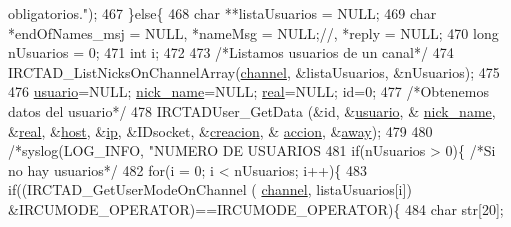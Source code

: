 \begin{DoxyCode}
{{{{{{{       obligatorios."});
467                         \}\textcolor{keywordflow}{else}\{
468                                 \textcolor{keywordtype}{char} **listaUsuarios = NULL;
469                                 \textcolor{keywordtype}{char} *endOfNames\_msj = NULL, *nameMsg = NULL;\textcolor{comment}{//, *reply = NULL;}
470                                 \textcolor{keywordtype}{long} nUsuarios = 0;
471                                 \textcolor{keywordtype}{int} i;
472 
473                                 \textcolor{comment}{/*Listamos usuarios de un canal*/}
474                                 IRCTAD\_ListNicksOnChannelArray(\hyperlink{_g-2361-06-_p1-_server_8c_a842ca2f026578e5c479c095ff3335969}{channel}, &listaUsuarios, &nUsuarios);
475 
476                                 \hyperlink{_g-2361-06-_p1-_server_8c_a0147a5b81499984f9cb00379a8cb84af}{usuario}=NULL; \hyperlink{_g-2361-06-_p1-_server_8c_aabbf66718cda228b924a4a9441eadf62}{nick\_name}=NULL; 
      \hyperlink{_g-2361-06-_p1-_server_8c_af832f551e1c343666c3d2a55834139a0}{real}=NULL; \textcolor{keywordtype}{id}=0;
477                                 \textcolor{comment}{/*Obtenemos datos del usuario*/}
478                                 IRCTADUser\_GetData (&\textcolor{keywordtype}{id}, &\hyperlink{_g-2361-06-_p1-_server_8c_a0147a5b81499984f9cb00379a8cb84af}{usuario}, &
      \hyperlink{_g-2361-06-_p1-_server_8c_aabbf66718cda228b924a4a9441eadf62}{nick\_name}, &\hyperlink{_g-2361-06-_p1-_server_8c_af832f551e1c343666c3d2a55834139a0}{real}, &\hyperlink{_g-2361-06-_p1-_server_8c_a1c2046dcb30a629d6d9f45ff8f403f12}{host}, &\hyperlink{_g-2361-06-_p1-_server_8c_afbc356cd0e25d1dbbece7c10fd025fa6}{ip}, &IDsocket, &\hyperlink{_g-2361-06-_p1-_server_8c_a26292066ca0d17922eadee4161542ab9}{creacion}, &
      \hyperlink{_g-2361-06-_p1-_server_8c_a93e785c991445d8b8ee99c2e51242d5a}{accion}, &\hyperlink{_g-2361-06-_p1-_server_8c_adf86742e21384f58f8999d8317e6a370}{away});
479 
480                                 \textcolor{comment}{/*syslog(LOG\_INFO, "NUMERO DE USUARIOS %
481                                 \textcolor{keywordflow}{if}(nUsuarios > 0)\{ \textcolor{comment}{/*Si no hay usuarios*/}
482                                         \textcolor{keywordflow}{for}(i = 0; i < nUsuarios; i++)\{
483                                                 \textcolor{keywordflow}{if}((IRCTAD\_GetUserModeOnChannel (
      \hyperlink{_g-2361-06-_p1-_server_8c_a842ca2f026578e5c479c095ff3335969}{channel}, listaUsuarios[i]) &IRCUMODE\_OPERATOR)==IRCUMODE\_OPERATOR)\{
484                                                         \textcolor{keywordtype}{char} str[20];
}}}}}}}
\end{DoxyCode}

